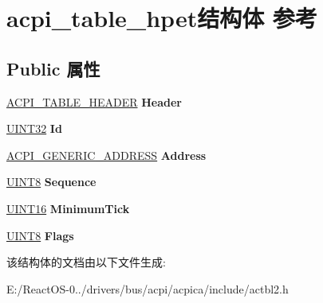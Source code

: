 \hypertarget{structacpi__table__hpet}{}\section{acpi\+\_\+table\+\_\+hpet结构体 参考}
\label{structacpi__table__hpet}
\subsection*{Public 属性}
\begin{DoxyCompactItemize}
\item 
\mbox{\label{structacpi__table__hpet_a03b65c7965cef872d0c9a500e7d1fe86}} 
\hyperlink{structacpi__table__header}{A\+C\+P\+I\+\_\+\+T\+A\+B\+L\+E\+\_\+\+H\+E\+A\+D\+ER} {\bfseries Header}
\item 
\mbox{\label{structacpi__table__hpet_aae8d752198ecd46215afcc42fa8a4dc1}} 
\hyperlink{_processor_bind_8h_ae1e6edbbc26d6fbc71a90190d0266018}{U\+I\+N\+T32} {\bfseries Id}
\item 
\mbox{\label{structacpi__table__hpet_a0590b8b7e1f928d0485445fe6a769058}} 
\hyperlink{structacpi__generic__address}{A\+C\+P\+I\+\_\+\+G\+E\+N\+E\+R\+I\+C\+\_\+\+A\+D\+D\+R\+E\+SS} {\bfseries Address}
\item 
\mbox{\label{structacpi__table__hpet_a4f7666efb67de3e958fe9b9f083f2fb4}} 
\hyperlink{_processor_bind_8h_ab27e9918b538ce9d8ca692479b375b6a}{U\+I\+N\+T8} {\bfseries Sequence}
\item 
\mbox{\label{structacpi__table__hpet_aa9df638931b839fe21363e17d5d4e8bf}} 
\hyperlink{_processor_bind_8h_a09f1a1fb2293e33483cc8d44aefb1eb1}{U\+I\+N\+T16} {\bfseries Minimum\+Tick}
\item 
\mbox{\label{structacpi__table__hpet_af8ca22f20b9909ae62cb7040da293ae1}} 
\hyperlink{_processor_bind_8h_ab27e9918b538ce9d8ca692479b375b6a}{U\+I\+N\+T8} {\bfseries Flags}
\end{DoxyCompactItemize}


该结构体的文档由以下文件生成\+:\begin{DoxyCompactItemize}
\item 
E\+:/\+React\+O\+S-\/0../drivers/bus/acpi/acpica/include/actbl2.\+h\end{DoxyCompactItemize}
